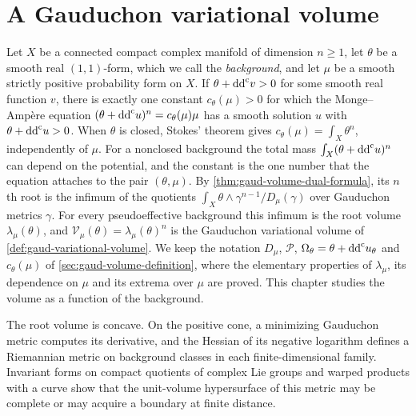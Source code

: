 \chapter{A Gauduchon variational volume}
\label{chap:gauduchon-variational-volume}

\begingroup
{}

Let $X$ be a connected compact complex manifold of dimension $n\geq1$, let $\theta$ be a smooth real $(1,1)$-form, which we call the \emph{background}, and let $\mu$ be a smooth strictly positive probability form on $X$. If $\theta+\mathrm{dd}^{\mathrm{c}} v>0$ for some smooth real function $v$, there is exactly one constant $c_\theta(\mu)>0$ for which the Monge--Amp\`ere equation $(\theta+\mathrm{dd}^{\mathrm{c}} u)^n=c_\theta(\mu)\mu$ has a smooth solution $u$ with $\theta+\mathrm{dd}^{\mathrm{c}} u>0$. When $\theta$ is closed, Stokes' theorem gives $c_\theta(\mu)=\int_X\theta^n$, independently of $\mu$. For a nonclosed background the total mass $\int_X(\theta+\mathrm{dd}^{\mathrm{c}} u)^n$ can depend on the potential, and the constant is the one number that the equation attaches to the pair $(\theta,\mu)$. By \cref{thm:gaud-volume-dual-formula}, its $n$th root is the infimum of the quotients $\int_X\theta\wedge\gamma^{n-1}/D_\mu(\gamma)$ over Gauduchon metrics $\gamma$. For every pseudoeffective background this infimum is the root volume $\lambda_\mu(\theta)$, and $\mathcal V_\mu(\theta)=\lambda_\mu(\theta)^n$ is the Gauduchon variational volume of \cref{def:gaud-variational-volume}. We keep the notation $D_\mu$, $\mathscr P$, $\Omega_\theta=\theta+\mathrm{dd}^{\mathrm{c}} u_\theta$ and $c_\theta(\mu)$ of \cref{sec:gaud-volume-definition}, where the elementary properties of $\lambda_\mu$, its dependence on $\mu$ and its extrema over $\mu$ are proved. This chapter studies the volume as a function of the background.

The root volume is concave. On the positive cone, a minimizing Gauduchon metric computes its derivative, and the Hessian of its negative logarithm defines a Riemannian metric on background classes in each finite-dimensional family. Invariant forms on compact quotients of complex Lie groups and warped products with a curve show that the unit-volume hypersurface of this metric may be complete or may acquire a boundary at finite distance.

